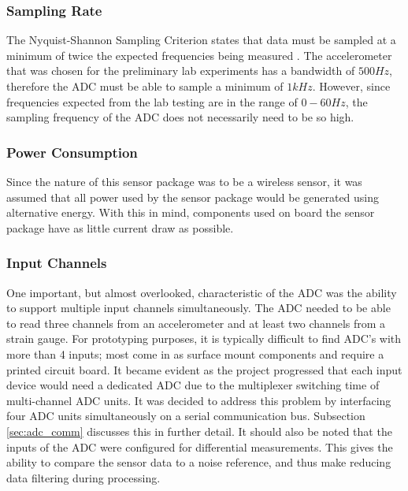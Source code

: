 \subsubsection{Sampling Rate}		%
\label{sec:adc_fin}
\indent The Nyquist-Shannon Sampling Criterion states that data must be sampled at a minimum of twice the expected frequencies being measured
\cite{MusaJouaneh:2013}. The accelerometer that was chosen for the preliminary lab experiments has a bandwidth of $500 Hz$, therefore the ADC must be able
to sample a minimum of $1kHz$. However, since frequencies expected from the lab testing are in the range of $0-60Hz$, the sampling frequency of the ADC
does not necessarily need to be so high. %
%
\subsubsection{Power Consumption}
\label{sec:adc_power_cons.}
\indent Since the nature of this sensor package was to be a wireless sensor, it was assumed that all power used by the sensor package would be generated
using alternative energy. With this in mind, components used on board the sensor package have as little current draw as possible.
%
\subsubsection{Input Channels}
\label{sec:adc_in_ch_num}
\indent One important, but almost overlooked, characteristic of the ADC was the ability to support multiple input channels simultaneously. The ADC needed
to be able to read three channels from an accelerometer and at least two channels from a strain gauge. For prototyping purposes, it is typically difficult
to find ADC's with more than 4 inputs; most come in as surface mount components and require a printed circuit board. It became evident as the project progressed that each input device would need a dedicated ADC due to the multiplexer switching time of multi-channel ADC units. 
It was decided to address this problem by interfacing four ADC units simultaneously on a serial communication bus.
Subsection \ref{sec:adc_comm} discusses this in further detail.
It should also be noted that the inputs of the ADC were configured for differential measurements.
This gives the ability to compare the sensor data to a noise reference, and thus make reducing data filtering during processing. 
%
